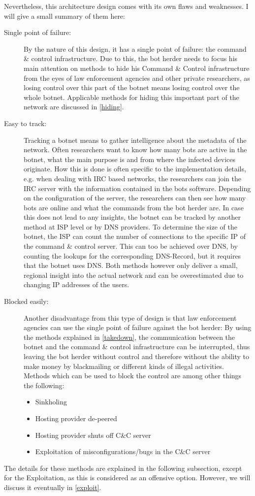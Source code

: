\documentclass[10pt, a4paper, twocolumn]{article} %
\begin{document}
Nevertheless, this architecture design comes with its own flaws and weaknesses. I will give a small summary of them here:
\begin{description}
\item[Single point of failure:]
By the nature of this design, it has a single point of failure: the command \& control infrastructure. Due to this, the bot herder needs to focus his main attention on methods to hide his Command \& Control infrastructure from the eyes of law enforcement agencies and other private researchers, as losing control over this part of the botnet means losing control over the whole botnet. Applicable methods for hiding this important part of the network are discussed in \autoref{hiding}. 
\item[Easy to track:]
Tracking a botnet means to gather intelligence about the metadata of the network. Often researchers want to know how many bots are active in the botnet, what the main purpose is and from where the infected devices originate. How this is done is often specific to the implementation details, e.g. when dealing with IRC based networks, the researchers can join the IRC server with the information contained in the bots software. Depending on the configuration of the server, the researchers can then see how many bots are online and what the commands from the bot herder are. In case this does not lead to any insights, the botnet can be tracked by another method at ISP level or by DNS providers. To determine the size of the botnet, the ISP can count the number of connections to the specific IP of the command \& control server. This can too be achieved over DNS, by counting the lookups for the corresponding DNS-Record, but it requires that the botnet uses DNS. Both methods however only deliver a small, regional insight into the actual network and can be overestimated due to changing IP addresses of the users. 
\item[Blocked easily:]
Another disadvantage from this type of design is that law enforcement agencies can use the single point of failure against the bot herder: By using the methods explained in \autoref{takedown}, the communication between the botnet and the command \& control infrastructure can be interrupted, thus leaving the bot herder without control and therefore without the ability to make money by blackmailing or different kinds of illegal activities.
Methods which can be used to block the control are among other things the following: 
\begin{itemize}
\item Sinkholing
\item Hosting provider de-peered
\item Hosting provider shuts off C\&C server
\item Exploitation of misconfigurations/bugs in the C\&C server
\end{itemize}
\end{description}
The details for these methods are explained in the following subsection, except for the Exploitation, as this is considered as an offensive option. However, we will discuss it eventually in \autoref{exploit}.
\end{document}
